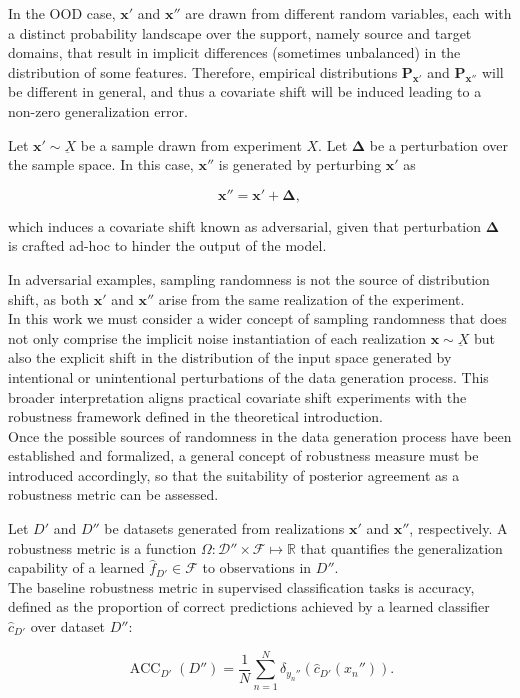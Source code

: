 In the OOD case, $\bm{x}'$ and $\bm{x}''$ are
drawn from different random variables, each with a distinct probability 
landscape over the support, namely source and target domains, that result 
in implicit differences (sometimes unbalanced) in the distribution of some features.
Therefore, empirical distributions $\mathbf{P}_{\bm{x}'}$ and $\mathbf{P}_{\bm{x}''}$ will
be different in general, and thus a covariate shift will be induced
leading to a non-zero generalization error.

\begin{definition}
    Let $\bm{x}' \sim \underbar{X}$ be a sample drawn from experiment
    $X$. Let $\bm{\Delta}$ be a perturbation over
    the sample space. In this case, $\bm{x}''$ is generated by perturbing $\bm{x}'$ as

    $$
    \bm{x}'' = \bm{x}' + \bm{\Delta},
    $$

    which induces a covariate shift known as adversarial, given that
    perturbation $\bm{\Delta}$ is crafted ad-hoc to hinder the 
    output of the model.
\end{definition}

In adversarial examples, sampling randomness is not the source of
distribution shift, as both $\bm{x}'$ and $\bm{x}''$ arise from
the same realization of the experiment. \\

In this work we must consider a wider concept of sampling 
randomness that does not only comprise the implicit
noise instantiation of each realization $\bm{x} \sim \underbar{X}$
but also the explicit shift in the distribution of the input space
generated by intentional or unintentional perturbations of the 
data generation process. This broader interpretation aligns practical
covariate shift experiments with the robustness framework
defined in the theoretical introduction.\\

Once the possible sources of randomness in the data 
generation process have been established and formalized, 
a general concept of robustness measure must be introduced 
accordingly, so that the suitability of posterior agreement
as a robustness metric can be assessed.

\begin{definition}
    Let $D'$ and $D''$ be datasets generated from realizations $\bm{x}'$ and $\bm{x}''$,
    respectively. 
    A robustness metric is a function $\Omega: \mathcal{D}'' \times \mathcal{F} \longmapsto \mathbb{R}$ 
    that quantifies the generalization
    capability of a learned $\hat{f}_{D'} \in \mathcal{F}$ to observations in $D''$. \\

    The baseline robustness metric in supervised classification tasks is
    accuracy, defined as the proportion of correct predictions 
    achieved by a learned classifier $\hat{c}_{D'}$ over 
    dataset $D''$:

    $$
    \operatorname{ACC}_{D'}(D'') = \frac{1}{N} \sum_{n=1}^N \delta_{y_n''} \left ( \hat{c}_{D'}(x_n'') \right ).
    $$

\end{definition}

